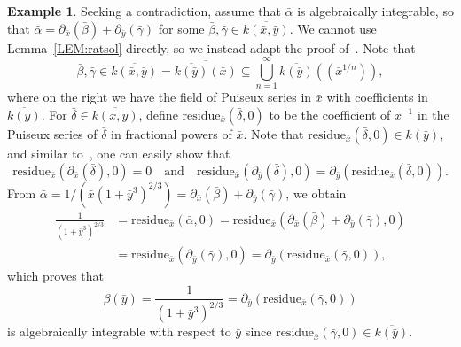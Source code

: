\documentclass{amsart}
\theoremstyle{definition}
\newtheorem{example}[thm]{Example}
\numberwithin{equation}{section}
\numberwithin{thm}{section}
\begin{document}
\begin{example}
Seeking a contradiction, assume that $\bar \alpha$ is algebraically integrable, so that $\bar \alpha = \partial_{\bar x}(\bar \beta) + \partial_{\bar y}(\bar \gamma)$ for some $\bar \beta, \bar \gamma\in \overline{k(\bar x, \bar y)}$.  We cannot use Lemma~\ref{LEM:ratsol} directly, so we instead adapt the proof of~\cite[Lemma 4]{ChenKauersSinger2012}. Note that
\[
 \bar \beta, \bar \gamma\in\overline{k(\bar x, \bar y)} = \overline{\overline{k(\bar y)} (\bar x)} \subseteq \bigcup_{n=1}^\infty \overline{k(\bar y)}(({\bar x}^{1/n})),
\]
where on the right we have the field of Puiseux series in $\bar x$ with coefficients in $\overline{k(\bar y)}$.  For $\bar \delta \in \overline{k(\bar x, \bar y)}$, define $\text{residue}_{\bar x}(\bar \delta,0)$ to be the coefficient of ${\bar x}^{-1}$ in the Puiseux series of $\bar\delta$ in fractional powers of $\bar x$.  Note that $\text{residue}_{\bar x}(\bar\delta,0) \in \overline{k(\bar y)}$, and similar to~\cite[Prop.~3]{ChenKauersSinger2012}, one can easily show that
\[
\text{residue}_{\bar x}(\partial_{\bar x}(\bar\delta),0) = 0 \quad \text{and} \quad \text{residue}_{\bar x}(\partial_{\bar y}(\bar\delta),0) = \partial_{\bar y}(\text{residue}_{\bar x}(\bar\delta,0)).
\]
From $\bar \alpha = 1/(\bar x(1+\bar{y}^3)^{2/3}) = \partial_{\bar x}(\bar \beta) + \partial_{\bar y}(\bar \gamma)$, we obtain
\begin{align*}
\frac{1}{(1+\bar{y}^3)^{2/3}} &= \text{residue}_{\bar x}(\bar \alpha,0) = \text{residue}_{\bar x}(\partial_{\bar x}(\bar \beta) + \partial_{\bar y}(\bar \gamma),0)\\ &= \text{residue}_{\bar x}(\partial_{\bar y}(\bar \gamma),0) = \partial_{\bar y}(\text{residue}_{\bar x}(\bar\gamma,0)),
\end{align*}
which proves that
\[
\beta(\bar{y}) = \frac{1}{(1+\bar{y}^3)^{2/3}} = \partial_{\bar y}(\text{residue}_{\bar x}(\bar\gamma,0))
\]
is algebraically integrable with respect to $\bar y$ since $\text{residue}_{\bar x}(\bar\gamma,0) \in \overline{k(\bar y)}$.


\end{example}
\end{document}
